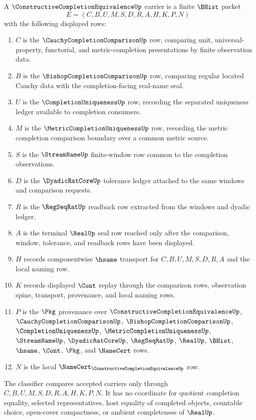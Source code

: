 \begin{definition}
\label{def:constructive-completion-equivalence-carrier}
A $\ConstructiveCompletionEquivalenceUp$ carrier is a finite $\BHist$ packet
$$
E=(C,B,U,M,S,D,R,A,H,K,P,N)
$$
with the following displayed rows:
\begin{enumerate}
\item $C$ is the $\CauchyCompletionComparisonUp$ row, comparing unit, universal-property, functorial, and metric-completion presentations by finite observation data.
\item $B$ is the $\BishopCompletionComparisonUp$ row, comparing regular located Cauchy data with the completion-facing real-name seal.
\item $U$ is the $\CompletionUniquenessUp$ row, recording the separated uniqueness ledger available to completion consumers.
\item $M$ is the $\MetricCompletionUniquenessUp$ row, recording the metric completion comparison boundary over a common metric source.
\item $S$ is the $\StreamNameUp$ finite-window row common to the completion observations.
\item $D$ is the $\DyadicRatCoreUp$ tolerance ledger attached to the same windows and comparison requests.
\item $R$ is the $\RegSeqRatUp$ readback row extracted from the windows and dyadic ledger.
\item $A$ is the terminal $\RealUp$ seal row reached only after the comparison, window, tolerance, and readback rows have been displayed.
\item $H$ records componentwise $\hsame$ transport for $C,B,U,M,S,D,R,A$ and the local naming row.
\item $K$ records displayed $\Cont$ replay through the comparison rows, observation spine, transport, provenance, and local naming rows.
\item $P$ is the $\Pkg$ provenance over $\ConstructiveCompletionEquivalenceUp$, $\CauchyCompletionComparisonUp$, $\BishopCompletionComparisonUp$, $\CompletionUniquenessUp$, $\MetricCompletionUniquenessUp$, $\StreamNameUp$, $\DyadicRatCoreUp$, $\RegSeqRatUp$, $\RealUp$, $\BHist$, $\hsame$, $\Cont$, $\Pkg$, and $\NameCert$ rows.
\item $N$ is the local $\NameCert_{\ConstructiveCompletionEquivalenceUp}$ row.
\end{enumerate}
The classifier compares accepted carriers only through $C,B,U,M,S,D,R,A,H,K,P,N$. It has no coordinate for quotient completion equality, selected representatives, host equality of completed objects, countable choice, open-cover compactness, or ambient completeness of $\RealUp$.
\end{definition}

